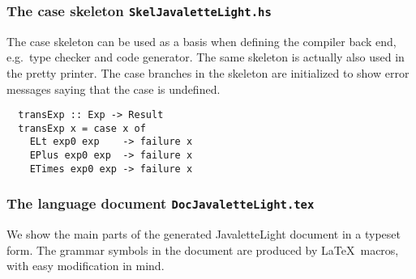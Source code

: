\documentclass[10pt]{article}
\begin{document}
\subsubsection{The case skeleton {\tt SkelJavaletteLight.hs}}

The case skeleton can be used as a basis when defining the compiler
back end, e.g.\ type checker and code generator. The same skeleton is
actually also used in the pretty printer. The case branches in the skeleton
are initialized to show error messages saying that the case is undefined.
\small
\begin{verbatim}
  transExp :: Exp -> Result
  transExp x = case x of
    ELt exp0 exp    -> failure x
    EPlus exp0 exp  -> failure x
    ETimes exp0 exp -> failure x
\end{verbatim}
\normalsize


\subsubsection{The language document {\tt DocJavaletteLight.tex}}

We show the main parts of the generated JavaletteLight document
in a typeset form. The grammar symbols in the document are produced
by \LaTeX\ macros, with easy modification in mind.
\end{document}
